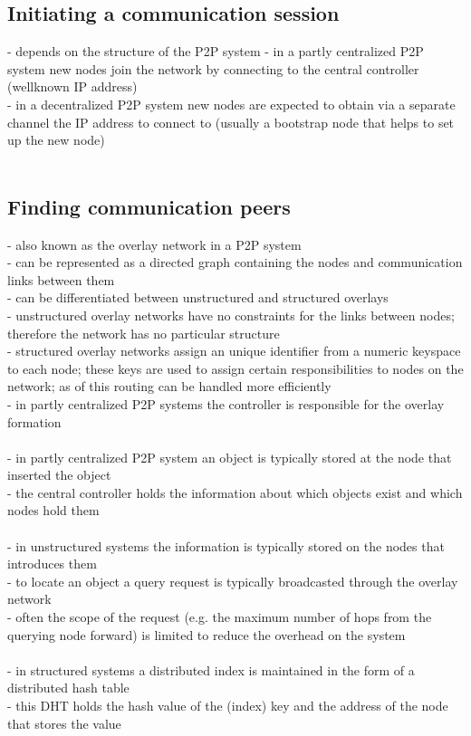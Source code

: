 
\subsection{Initiating a communication session}
\label{sec:p2p_init_session}

- depends on the structure of the P2P system
- in a partly centralized P2P system new nodes join the network by connecting to the central controller (wellknown IP address) \\
- in a decentralized P2P system new nodes are expected to obtain via a separate channel the IP address to connect to (usually a bootstrap node that helps to set up the new node) \\
\\


\subsection{Finding communication peers}
\label{sec:p2p_finding_peers}

- also known as the overlay network in a P2P system \\
- can be represented as a directed graph containing the nodes and communication links between them \\
- can be differentiated between unstructured and structured overlays \\
- unstructured overlay networks have no constraints for the links between nodes; therefore the network has no particular structure \\
- structured overlay networks assign an unique identifier from a numeric keyspace to each node; these keys are used to assign certain responsibilities to nodes
on the network; as of this routing can be handled more efficiently \\
- in partly centralized P2P systems the controller is responsible for the overlay formation \\
\\
- in partly centralized P2P system an object is typically stored at the node that inserted the object \\
- the central controller holds the information about which objects exist and which nodes hold them \\
\\
- in unstructured systems the information is typically stored on the nodes that introduces them \\
- to locate an object a query request is typically broadcasted through the overlay network \\
- often the scope of the request (e.g. the maximum number of hops from the querying node forward) is limited to reduce the overhead on the system \\
\\
- in structured systems a distributed index is maintained in the form of a distributed hash table \\
- this DHT holds the hash value of the (index) key and the address of the node that stores the value \\
\\

